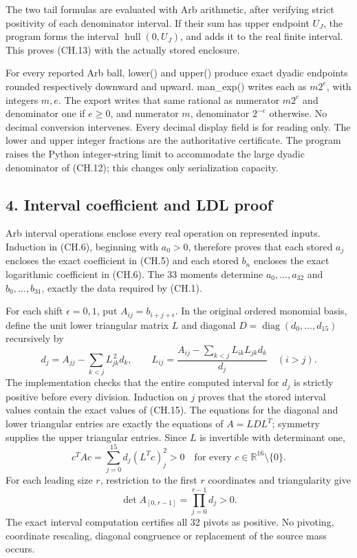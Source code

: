 The two tail formulas are evaluated with Arb arithmetic, after verifying strict positivity of each denominator interval. If their sum has upper endpoint \(U_J\), the program forms the interval \(\operatorname{hull}(0,U_J)\), and adds it to the real finite interval. This proves (CH.13) with the actually stored enclosure.

For every reported Arb ball, lower() and upper() produce exact dyadic endpoints rounded respectively downward and upward. man\_exp() writes each as \(m2^e\), with integers \(m,e\). The export writes that same rational as numerator \(m2^e\) and denominator one if \(e\ge0\), and numerator \(m\), denominator \(2^{-e}\) otherwise. No decimal conversion intervenes. Every decimal display field is for reading only. The lower and upper integer fractions are the authoritative certificate. The program raises the Python integer-string limit to accommodate the large dyadic denominator of (CH.12); this changes only serialization capacity.

\subsection{4. Interval coefficient and LDL proof}\label{interval-coefficient-and-ldl-proof}

Arb interval operations enclose every real operation on represented inputs. Induction in (CH.6), beginning with \(a_0>0\), therefore proves that each stored \(a_j\) encloses the exact coefficient in (CH.5) and each stored \(b_n\) encloses the exact logarithmic coefficient in (CH.6). The 33 moments determine \(a_0,\ldots,a_{32}\) and \(b_0,\ldots,b_{31}\), exactly the data required by (CH.1).

For each shift \(\epsilon=0,1\), put \(A_{ij}=b_{i+j+\epsilon}\). In the original ordered monomial basis, define the unit lower triangular matrix \(L\) and diagonal \(D=\operatorname{diag}(d_0,\ldots,d_{15})\) recursively by \[
 d_j=A_{jj}-\sum_{k<j}L_{jk}^{\,2}d_k,\qquad
 L_{ij}=\frac{A_{ij}-\sum_{k<j}L_{ik}L_{jk}d_k}{d_j}\quad(i>j).
\tag{CH.15}
\] The implementation checks that the entire computed interval for \(d_j\) is strictly positive before every division. Induction on \(j\) proves that the stored interval values contain the exact values of (CH.15). The equations for the diagonal and lower triangular entries are exactly the equations of \(A=LDL^T\); symmetry supplies the upper triangular entries. Since \(L\) is invertible with determinant one, \[
 c^TAc=\sum_{j=0}^{15}d_j(L^Tc)_j^2>0
 \quad\text{for every }c\in\mathbb R^{16}\setminus\{0\}.
\tag{CH.16}
\] For each leading size \(r\), restriction to the first \(r\) coordinates and triangularity give \[
 \det A_{[0,r-1]}=\prod_{j=0}^{r-1}d_j>0.
\tag{CH.17}
\] The exact interval computation certifies all 32 pivots as positive. No pivoting, coordinate rescaling, diagonal congruence or replacement of the source mass occurs.

